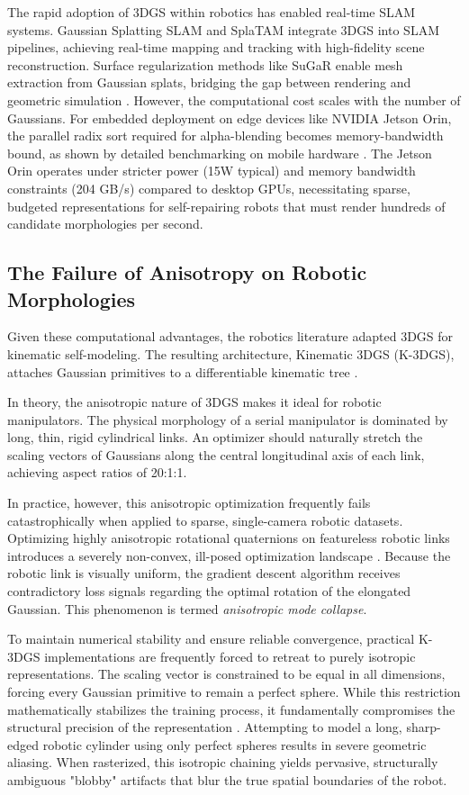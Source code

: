 \documentclass[12pt,a4paper,oneside]{report}
\begin{document}
The rapid adoption of 3DGS within robotics has enabled real-time SLAM systems. Gaussian Splatting SLAM \cite{matsuki2024gaussian} and SplaTAM \cite{keetha2024splattam} integrate 3DGS into SLAM pipelines, achieving real-time mapping and tracking with high-fidelity scene reconstruction. Surface regularization methods like SuGaR enable mesh extraction from Gaussian splats, bridging the gap between rendering and geometric simulation \cite{guedon2024sugar}. However, the computational cost scales with the number of Gaussians. For embedded deployment on edge devices like NVIDIA Jetson Orin, the parallel radix sort required for alpha-blending becomes memory-bandwidth bound, as shown by detailed benchmarking on mobile hardware \cite{lassanske2024gaurast}. The Jetson Orin operates under stricter power (15W typical) and memory bandwidth constraints (204 GB/s) compared to desktop GPUs, necessitating sparse, budgeted representations for self-repairing robots that must render hundreds of candidate morphologies per second.

\subsection{The Failure of Anisotropy on Robotic Morphologies}

Given these computational advantages, the robotics literature adapted 3DGS for kinematic self-modeling. The resulting architecture, Kinematic 3DGS (K-3DGS), attaches Gaussian primitives to a differentiable kinematic tree \cite{hu2025learning}.

In theory, the anisotropic nature of 3DGS makes it ideal for robotic manipulators. The physical morphology of a serial manipulator is dominated by long, thin, rigid cylindrical links. An optimizer should naturally stretch the scaling vectors of Gaussians along the central longitudinal axis of each link, achieving aspect ratios of 20:1:1.

In practice, however, this anisotropic optimization frequently fails catastrophically when applied to sparse, single-camera robotic datasets. Optimizing highly anisotropic rotational quaternions on featureless robotic links introduces a severely non-convex, ill-posed optimization landscape \cite{hu2025learning}. Because the robotic link is visually uniform, the gradient descent algorithm receives contradictory loss signals regarding the optimal rotation of the elongated Gaussian. This phenomenon is termed \textit{anisotropic mode collapse}.

To maintain numerical stability and ensure reliable convergence, practical K-3DGS implementations are frequently forced to retreat to purely isotropic representations. The scaling vector is constrained to be equal in all dimensions, forcing every Gaussian primitive to remain a perfect sphere. While this restriction mathematically stabilizes the training process, it fundamentally compromises the structural precision of the representation \cite{hu2025learning}. Attempting to model a long, sharp-edged robotic cylinder using only perfect spheres results in severe geometric aliasing. When rasterized, this isotropic chaining yields pervasive, structurally ambiguous "blobby" artifacts that blur the true spatial boundaries of the robot.
\end{document}
